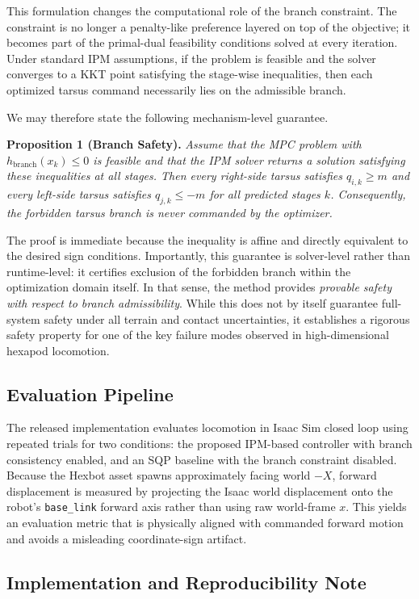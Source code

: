 This formulation changes the computational role of the branch constraint. The constraint is no longer a penalty-like preference layered on top of the objective; it becomes part of the primal-dual feasibility conditions solved at every iteration. Under standard IPM assumptions, if the problem is feasible and the solver converges to a KKT point satisfying the stage-wise inequalities, then each optimized tarsus command necessarily lies on the admissible branch.

We may therefore state the following mechanism-level guarantee.

\textbf{Proposition 1 (Branch Safety).}
\emph{Assume that the MPC problem with $h_{\mathrm{branch}}(x_k)\le 0$ is feasible and that the IPM solver returns a solution satisfying these inequalities at all stages. Then every right-side tarsus satisfies $q_{i,k}\ge m$ and every left-side tarsus satisfies $q_{j,k}\le -m$ for all predicted stages $k$. Consequently, the forbidden tarsus branch is never commanded by the optimizer.}

The proof is immediate because the inequality is affine and directly equivalent to the desired sign conditions. Importantly, this guarantee is solver-level rather than runtime-level: it certifies exclusion of the forbidden branch within the optimization domain itself. In that sense, the method provides \emph{provable safety with respect to branch admissibility}. While this does not by itself guarantee full-system safety under all terrain and contact uncertainties, it establishes a rigorous safety property for one of the key failure modes observed in high-dimensional hexapod locomotion.

\subsection{Evaluation Pipeline}

The released implementation evaluates locomotion in Isaac Sim closed loop using repeated trials for two conditions: the proposed IPM-based controller with branch consistency enabled, and an SQP baseline with the branch constraint disabled. Because the Hexbot asset spawns approximately facing world $-X$, forward displacement is measured by projecting the Isaac world displacement onto the robot's \texttt{base\_link} forward axis rather than using raw world-frame $x$. This yields an evaluation metric that is physically aligned with commanded forward motion and avoids a misleading coordinate-sign artifact.

\subsection{Implementation and Reproducibility Note}

